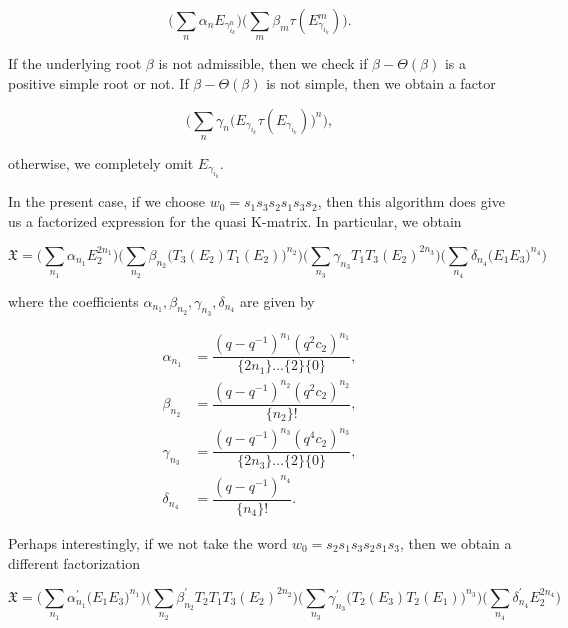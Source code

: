 \documentclass[a4 paper, 10pt]{article}
\theoremstyle{definition}
\theoremstyle{remark}
\numberwithin{equation}{section}
\begin{document}
\begin{equation}
	\big( \sum_{n} \alpha_{n}E_{\gamma_{i_k}^n} \big) \big( \sum_{m} \beta_{m}\tau(E_{\gamma_{i_k}}^m) \big).
\end{equation}  

If the underlying root $\beta$ is not admissible, then we check if $\beta - \Theta(\beta)$ is a positive simple root or not. If $\beta - \Theta(\beta)$ is not simple, then we obtain a factor

\begin{equation}
	\Big( \sum_{n} \gamma_{n} \big( E_{\gamma_{i_k}}\tau(E_{\gamma_{i_k}}) \big)^n \Big),
\end{equation}

otherwise, we completely omit $E_{\gamma_{i_k}}$. 

In the present case, if we choose $w_0 = s_1s_3s_2s_1s_3s_2$, then this algorithm does give us a factorized expression for the quasi K-matrix. In particular, we obtain

\begin{equation}
	\mathfrak{X} = \Big( \sum_{n_1} \alpha_{n_1} E_2^{2n_1} \Big) \Big( \sum_{n_2} \beta_{n_2} \big( T_3(E_2)T_1(E_2) \big)^{n_2} \Big) \Big( \sum_{n_3} \gamma_{n_3} T_1T_3(E_2)^{2n_3} \Big) \Big( \sum_{n_4} \delta_{n_4} \big( E_1E_3 \big)^{n_4} \Big) 
\end{equation}

where the coefficients $\alpha_{n_1}, \beta_{n_2}, \gamma_{n_3}, \delta_{n_4}$ are given by

\begin{align*}
	\alpha_{n_1} &= \dfrac{ ( q - q^{-1} )^{n_1} ( q^2 c_{2} )^{n_1} }{ \{2n_1\} \dots \{2\} \{0 \}},\\ 		
	\beta_{n_2} &= \dfrac{ (q - q^{-1})^{n_2} ( q^2 c_{2} )^{n_2}}{ \{n_2\}! },\\
	\gamma_{n_3} &= \dfrac{( q - q^{-1} )^{n_3} ( q^4 c_{2} )^{n_3} }{ \{2n_3\} \dots \{2\} \{0\} },\\		
	\delta_{n_4} &= \dfrac{ ( q - q^{-1} )^{n_4} }{ \{n_4\}! }.
\end{align*}

Perhaps interestingly, if we not take the word $w_0 = s_2s_1s_3s_2s_1s_3$, then we obtain a different factorization

\begin{equation}
	\mathfrak{X} = \Big( \sum_{n_1} \alpha^{\prime}_{n_1} \big( E_1E_3 \big)^{n_1} \Big) \Big( \sum_{n_2} \beta^{\prime}_{n_2} T_2T_1T_3(E_2)^{2n_2} \Big) \Big( \sum_{n_3} \gamma^{\prime}_{n_3}  \big( T_2(E_3)T_2(E_1) \big)^{n_3} \Big) \Big( \sum_{n_4} \delta^{\prime}_{n_4} E_2^{2n_4} \Big) 
\end{equation}
\end{document}
